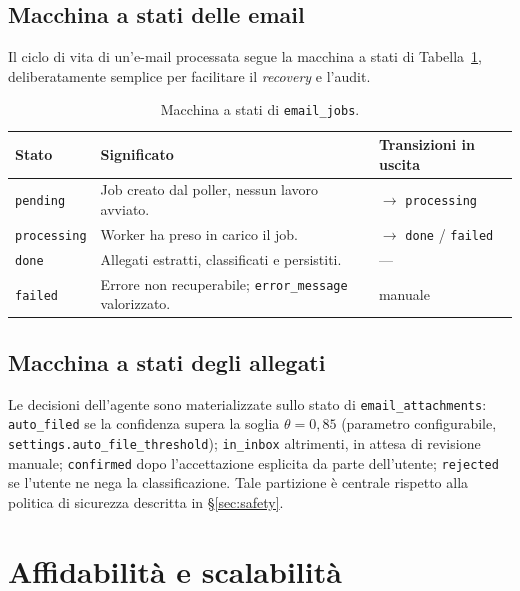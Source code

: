\documentclass[11pt,a4paper,oneside]{article}
\begin{document}
\subsection{Macchina a stati delle email}
Il ciclo di vita di un'e-mail processata segue la macchina a stati di
Tabella~\ref{tab:state-machine}, deliberatamente semplice per facilitare il
\emph{recovery} e l'audit.

\begin{table}[ht]
\centering
\small
\begin{tabularx}{\linewidth}{l X l}
\toprule
\textbf{Stato} & \textbf{Significato} & \textbf{Transizioni in uscita} \\
\midrule
\texttt{pending}   & Job creato dal poller, nessun lavoro avviato.       & $\rightarrow$ \texttt{processing} \\
\texttt{processing}& Worker ha preso in carico il job.                   & $\rightarrow$ \texttt{done} / \texttt{failed} \\
\texttt{done}      & Allegati estratti, classificati e persistiti.       & --- \\
\texttt{failed}    & Errore non recuperabile; \texttt{error\_message} valorizzato. & manuale \\
\bottomrule
\end{tabularx}
\caption{Macchina a stati di \texttt{email\_jobs}.}
\label{tab:state-machine}
\end{table}

\subsection{Macchina a stati degli allegati}
Le decisioni dell'agente sono materializzate sullo stato di
\texttt{email\_attachments}: \texttt{auto\_filed} se la confidenza supera
la soglia $\theta = 0{,}85$ (parametro configurabile,
\texttt{settings.auto\_file\_threshold}); \texttt{in\_inbox} altrimenti, in
attesa di revisione manuale; \texttt{confirmed} dopo l'accettazione esplicita
da parte dell'utente; \texttt{rejected} se l'utente ne nega la classificazione.
Tale partizione \`e centrale rispetto alla politica di sicurezza descritta in
\S\ref{sec:safety}.

\section{Affidabilit\`a e scalabilit\`a}
\end{document}
